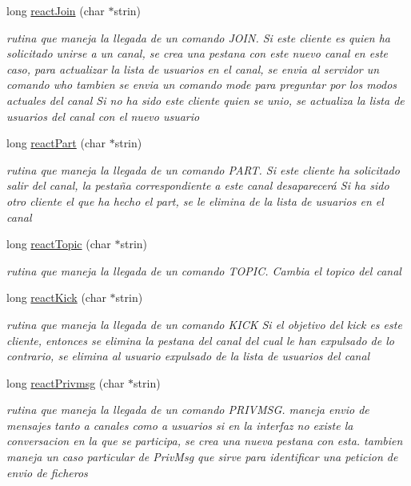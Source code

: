 \begin{DoxyCompactItemize}
long \hyperlink{_g-2301-05-_p2-basic_commands_from_server_8h_aac734783cf3067915cdfe1d4968cf8d1}{react\-Join} (char $\ast$strin)
\begin{DoxyCompactList}\small\item\em rutina que maneja la llegada de un comando J\-O\-I\-N. Si este cliente es quien ha solicitado unirse a un canal, se crea una pestana con este nuevo canal en este caso, para actualizar la lista de usuarios en el canal, se envia al servidor un comando who tambien se envia un comando mode para preguntar por los modos actuales del canal Si no ha sido este cliente quien se unio, se actualiza la lista de usuarios del canal con el nuevo usuario \end{DoxyCompactList}\item 
long \hyperlink{_g-2301-05-_p2-basic_commands_from_server_8h_a28c3a9c34508c23d3f81c2326101e8e7}{react\-Part} (char $\ast$strin)
\begin{DoxyCompactList}\small\item\em rutina que maneja la llegada de un comando P\-A\-R\-T. Si este cliente ha solicitado salir del canal, la pestaña correspondiente a este canal desaparecerá Si ha sido otro cliente el que ha hecho el part, se le elimina de la lista de usuarios en el canal \end{DoxyCompactList}\item 
long \hyperlink{_g-2301-05-_p2-basic_commands_from_server_8h_a1d86d105c8fe9b9fc6c55c5bc2406f37}{react\-Topic} (char $\ast$strin)
\begin{DoxyCompactList}\small\item\em rutina que maneja la llegada de un comando T\-O\-P\-I\-C. Cambia el topico del canal \end{DoxyCompactList}\item 
long \hyperlink{_g-2301-05-_p2-basic_commands_from_server_8h_a4f7dc613a25eb6eda89ad289feec5f16}{react\-Kick} (char $\ast$strin)
\begin{DoxyCompactList}\small\item\em rutina que maneja la llegada de un comando K\-I\-C\-K Si el objetivo del kick es este cliente, entonces se elimina la pestana del canal del cual le han expulsado de lo contrario, se elimina al usuario expulsado de la lista de usuarios del canal \end{DoxyCompactList}\item 
long \hyperlink{_g-2301-05-_p2-basic_commands_from_server_8h_aa0f0ef9fd0a3facea1983061e1648e87}{react\-Privmsg} (char $\ast$strin)
\begin{DoxyCompactList}\small\item\em rutina que maneja la llegada de un comando P\-R\-I\-V\-M\-S\-G. maneja envio de mensajes tanto a canales como a usuarios si en la interfaz no existe la conversacion en la que se participa, se crea una nueva pestana con esta. tambien maneja un caso particular de Priv\-Msg que sirve para identificar una peticion de envio de ficheros \end{DoxyCompactList}\item 

\end{DoxyCompactItemize}
